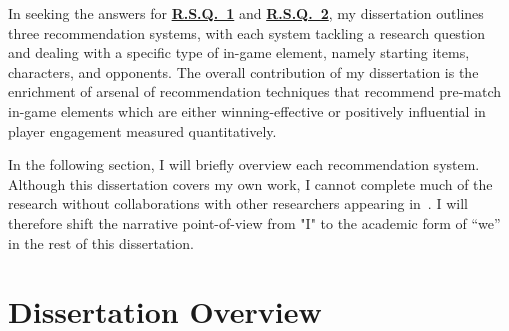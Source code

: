 


In seeking the answers for \hyperref[rq1]{\textbf{R.S.Q.~1}} and \hyperref[rq2]{\textbf{R.S.Q.~2}}, my dissertation outlines three recommendation systems, with each system tackling a research question and dealing with a specific type of in-game element, namely starting items, characters, and opponents. The overall contribution of my dissertation is the enrichment of  arsenal of recommendation techniques that recommend  pre-match in-game elements which are either winning-effective or positively influential in player engagement measured  quantitatively.

In the following section, I will briefly overview each recommendation system. Although this dissertation covers my own work, I cannot complete much of the research without collaborations with other researchers appearing in~\cite{chenqdeckrec,chen2018draft,chen2017eomm}. I will therefore shift the narrative point-of-view from "I" to the academic form of “we” in the rest of this dissertation.


\section{Dissertation Overview}\label{sec:thesis_overview}

